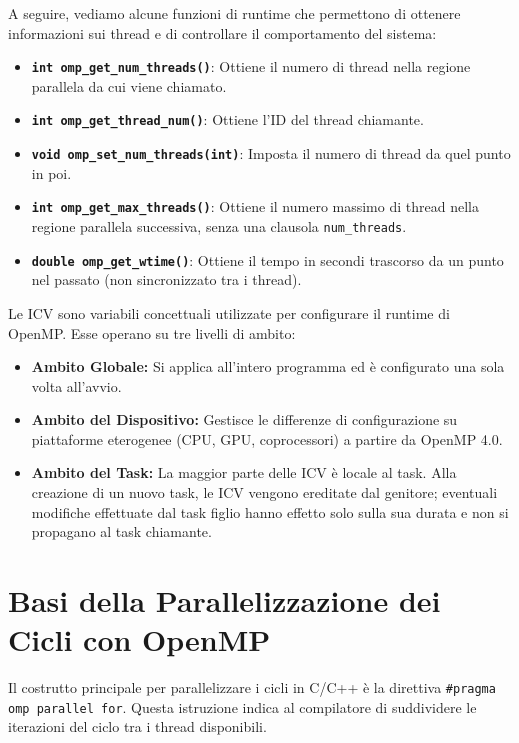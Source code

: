 A seguire, vediamo alcune funzioni di runtime che permettono di ottenere informazioni sui thread e di controllare il comportamento del sistema:
\begin{itemize}
    \item \textbf{\texttt{int omp\_get\_num\_threads()}}: Ottiene il numero di thread nella regione parallela da cui viene chiamato.
    \item \textbf{\texttt{int omp\_get\_thread\_num()}}: Ottiene l'ID del thread chiamante.
    \item \textbf{\texttt{void omp\_set\_num\_threads(int)}}: Imposta il numero di thread da quel punto in poi.
    \item \textbf{\texttt{int omp\_get\_max\_threads()}}: Ottiene il numero massimo di thread nella regione parallela successiva, senza una clausola \texttt{num\_threads}.
    \item \textbf{\texttt{double omp\_get\_wtime()}}: Ottiene il tempo in secondi trascorso da un punto nel passato (non sincronizzato tra i thread).
\end{itemize}
Le ICV sono variabili concettuali utilizzate per configurare il runtime di OpenMP. Esse operano su tre livelli di ambito:

\begin{itemize}
    \item \textbf{Ambito Globale:} Si applica all'intero programma ed è configurato una sola volta all'avvio.
    \item \textbf{Ambito del Dispositivo:} Gestisce le differenze di configurazione su piattaforme eterogenee (CPU, GPU, coprocessori) a partire da OpenMP 4.0.
    \item \textbf{Ambito del Task:} La maggior parte delle ICV è locale al task. Alla creazione di un nuovo task, le ICV vengono ereditate dal genitore; eventuali modifiche effettuate dal task figlio hanno effetto solo sulla sua durata e non si propagano al task chiamante.
\end{itemize}

\section{Basi della Parallelizzazione dei Cicli con OpenMP}

Il costrutto principale per parallelizzare i cicli in C/C++ è la direttiva \texttt{\#pragma omp parallel for}. Questa istruzione indica al compilatore di suddividere le iterazioni del ciclo tra i thread disponibili.

